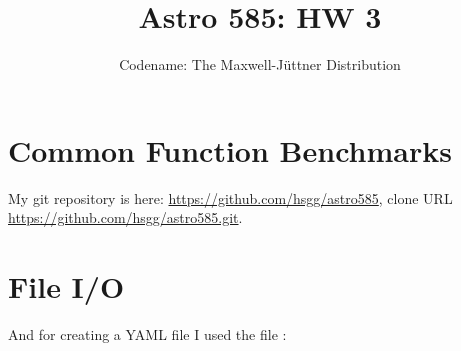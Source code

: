 \documentclass[11pt]{article}
\title{Astro 585: HW 3}
\author{Codename: The Maxwell-Jüttner Distribution}
\begin{document}
\maketitle

\section{Common Function Benchmarks}
My git repository is here: \url{https://github.com/hsgg/astro585}, clone URL
\url{https://github.com/hsgg/astro585.git}.

\section{File I/O}


And for creating a YAML file I used the file :

\end{document}
